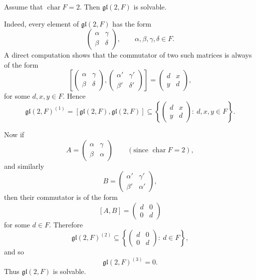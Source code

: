 \begin{example}
    Assume that $\operatorname{char} F = 2$. Then $\mathfrak{gl}(2,F)$ is solvable.

    Indeed, every element of $\mathfrak{gl}(2,F)$ has the form
    \[
        \begin{pmatrix}
            \alpha & \gamma \\
            \beta  & \delta
        \end{pmatrix},
        \qquad \alpha,\beta,\gamma,\delta \in F.
    \]
    A direct computation shows that the commutator of two such matrices is always of the form
    \[
        \left[
            \begin{pmatrix}
                \alpha & \gamma \\
                \beta  & \delta
            \end{pmatrix},
            \begin{pmatrix}
                \alpha' & \gamma' \\
                \beta'  & \delta'
            \end{pmatrix}
            \right]
        =
        \begin{pmatrix}
            d & x \\
            y & d
        \end{pmatrix},
    \]
    for some $d,x,y \in F$.
    Hence
    \[
        \mathfrak{gl}(2,F)^{(1)}=[\mathfrak{gl}(2,F),\mathfrak{gl}(2,F)]
        \subseteq
        \left\{
        \begin{pmatrix}
            d & x \\
            y & d
        \end{pmatrix}
        :\ d,x,y\in F
        \right\}.
    \]

    Now if
    \[
        A
        =
        \begin{pmatrix}
            \alpha & \gamma \\
            \beta  & \alpha
        \end{pmatrix}
        \qquad (\text{since } \operatorname{char} F=2),
    \]
    and similarly
    \[
        B=
        \begin{pmatrix}
            \alpha' & \gamma' \\
            \beta'  & \alpha'
        \end{pmatrix},
    \]
    then their commutator is of the form
    \[
        [A,B]=
        \begin{pmatrix}
            d & 0 \\
            0 & d
        \end{pmatrix}
    \]
    for some $d\in F$.
    Therefore
    \[
        \mathfrak{gl}(2,F)^{(2)}
        \subseteq
        \left\{
        \begin{pmatrix}
            d & 0 \\
            0 & d
        \end{pmatrix}
        :\ d\in F
        \right\},
    \]
    and so
    \[
        \mathfrak{gl}(2,F)^{(3)}=0.
    \]
    Thus $\mathfrak{gl}(2,F)$ is solvable.
\end{example}

